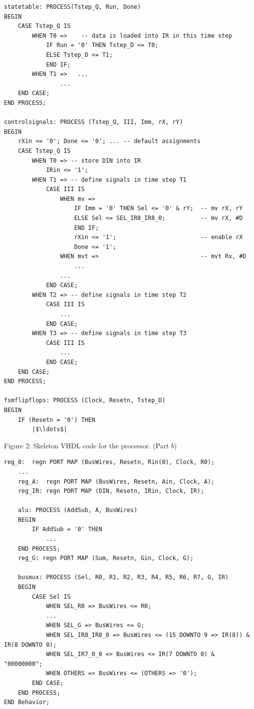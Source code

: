 \documentclass[epsfig,10pt,fullpage]{article} \addtolength{\textwidth}{1.5in}
\begin{document}
\begin{enumerate}
\begin{center}
\begin{minipage}[t]{15 cm}
\begin{lstlisting}[name=proc]
statetable: PROCESS(Tstep_Q, Run, Done)
BEGIN
    CASE Tstep_Q IS
        WHEN T0 =>    -- data is loaded into IR in this time step
            IF Run = '0' THEN Tstep_D <= T0;
            ELSE Tstep_D <= T1;
            END IF;
        WHEN T1 =>   ...
                ...
    END CASE;
END PROCESS;

controlsignals: PROCESS (Tstep_Q, III, Imm, rX, rY)
BEGIN
    rXin <= '0'; Done <= '0'; ... -- default assignments
    CASE Tstep_Q IS
        WHEN T0 => -- store DIN into IR
            IRin <= '1';
        WHEN T1 => -- define signals in time step T1
            CASE III IS
                WHEN mv =>
                    IF Imm = '0' THEN Sel <= '0' & rY;  -- mv rX, rY
                    ELSE Sel <= SEL_IR8_IR8_0;          -- mv rX, #D
                    END IF;
                    rXin <= '1';                        -- enable rX
                    Done <= '1';
                WHEN mvt =>                             -- mvt Rx, #D
                    ...
                ...
            END CASE;
        WHEN T2 => -- define signals in time step T2
            CASE III IS
                ...
            END CASE;                
        WHEN T3 => -- define signals in time step T3
            CASE III IS
                ...
            END CASE;
    END CASE;
END PROCESS;

fsmflipflops: PROCESS (Clock, Resetn, Tstep_D)
BEGIN
    IF (Resetn = '0') THEN
        |$\ldots$|
\end{lstlisting}
\end{minipage}
\end{center}

\begin{center}
Figure 2: Skeleton VHDL code for the processor. (Part $b$)
\end{center}

\begin{center}
\begin{minipage}[t]{15 cm}
\begin{lstlisting}[name=proc]
    reg_0:  regn PORT MAP (BusWires, Resetn, Rin(0), Clock, R0);
    ...
    reg_A:  regn PORT MAP (BusWires, Resetn, Ain, Clock, A);
    reg_IR: regn PORT MAP (DIN, Resetn, IRin, Clock, IR);

    alu: PROCESS (AddSub, A, BusWires)
    BEGIN
        IF AddSub = '0' THEN
            ...
    END PROCESS;
    reg_G: regn PORT MAP (Sum, Resetn, Gin, Clock, G);

    busmux: PROCESS (Sel, R0, R1, R2, R3, R4, R5, R6, R7, G, IR)
    BEGIN
        CASE Sel IS
            WHEN SEL_R0 => BusWires <= R0;
            ...
            WHEN SEL_G => BusWires <= G;
            WHEN SEL_IR8_IR8_0 => BusWires <= (15 DOWNTO 9 => IR(8)) & IR(8 DOWNTO 0);
            WHEN SEL_IR7_0_0 => BusWires <= IR(7 DOWNTO 0) & "00000000";
            WHEN OTHERS => BusWires <= (OTHERS => '0');
        END CASE;
    END PROCESS;   
END Behavior;


\end{lstlisting}
\end{minipage}
\end{center}
\end{enumerate}
\end{document}
